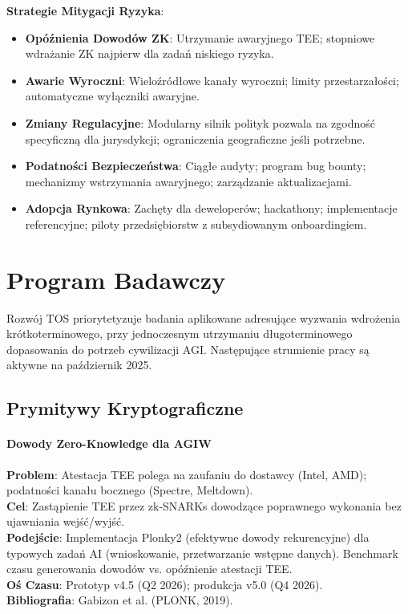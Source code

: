 \documentclass[11pt]{article}
\begin{document}
\textbf{Strategie Mitygacji Ryzyka}:
\begin{itemize}[noitemsep]
  \item \textbf{Opóźnienia Dowodów ZK}: Utrzymanie awaryjnego TEE; stopniowe wdrażanie ZK najpierw dla zadań niskiego ryzyka.
  \item \textbf{Awarie Wyroczni}: Wieloźródłowe kanały wyroczni; limity przestarzałości; automatyczne wyłączniki awaryjne.
  \item \textbf{Zmiany Regulacyjne}: Modularny silnik polityk pozwala na zgodność specyficzną dla jurysdykcji; ograniczenia geograficzne jeśli potrzebne.
  \item \textbf{Podatności Bezpieczeństwa}: Ciągłe audyty; program bug bounty; mechanizmy wstrzymania awaryjnego; zarządzanie aktualizacjami.
  \item \textbf{Adopcja Rynkowa}: Zachęty dla deweloperów; hackathony; implementacje referencyjne; piloty przedsiębiorstw z subsydiowanym onboardingiem.
\end{itemize}

\section{Program Badawczy}
\label{sec:research}

Rozwój TOS priorytetyzuje badania aplikowane adresujące wyzwania wdrożenia krótkoterminowego, przy jednoczesnym utrzymaniu długoterminowego dopasowania do potrzeb cywilizacji AGI. Następujące strumienie pracy są aktywne na październik 2025.

\subsection{Prymitywy Kryptograficzne}

\paragraph{Dowody Zero-Knowledge dla AGIW}
\textbf{Problem}: Atestacja TEE polega na zaufaniu do dostawcy (Intel, AMD); podatności kanału bocznego (Spectre, Meltdown).\\
\textbf{Cel}: Zastąpienie TEE przez zk-SNARKs dowodzące poprawnego wykonania bez ujawniania wejść/wyjść.\\
\textbf{Podejście}: Implementacja Plonky2 (efektywne dowody rekurencyjne) dla typowych zadań AI (wnioskowanie, przetwarzanie wstępne danych). Benchmark czasu generowania dowodów vs. opóźnienie atestacji TEE.\\
\textbf{Oś Czasu}: Prototyp v4.5 (Q2 2026); produkcja v5.0 (Q4 2026).\\
\textbf{Bibliografia}: Gabizon et al. (PLONK, 2019).
\end{document}
